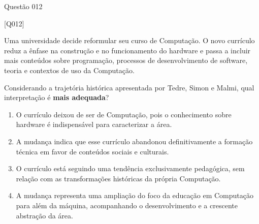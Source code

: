 \documentclass[xcolor=dvipsnames,table]{beamer}
\begin{document}
    { \logo{}
    \begin{frame}{Questão 012}

    \footnotesize

    \begin{block}{[Q012]}

    Uma universidade decide reformular seu curso de Computação. O novo currículo reduz a ênfase na construção e no funcionamento do hardware e passa a incluir mais conteúdos sobre programação, processos de desenvolvimento de software, teoria e contextos de uso da Computação.

    Considerando a trajetória histórica apresentada por Tedre, Simon e Malmi, qual interpretação é \textbf{mais adequada}?

    \end{block}

    \begin{enumerate}[label=(\Alph*)]

        \item O currículo deixou de ser de Computação, pois o conhecimento sobre hardware é indispensável para caracterizar a área.

        \item A mudança indica que esse currículo abandonou definitivamente a formação técnica em favor de conteúdos sociais e culturais.

        \item O currículo está seguindo uma tendência exclusivamente pedagógica, sem relação com as transformações históricas da própria Computação.
        
        \item A mudança representa uma ampliação do foco da educação em Computação para além da máquina, acompanhando o desenvolvimento e a crescente abstração da área.

    \end{enumerate}

\end{frame}
}
\end{document}

